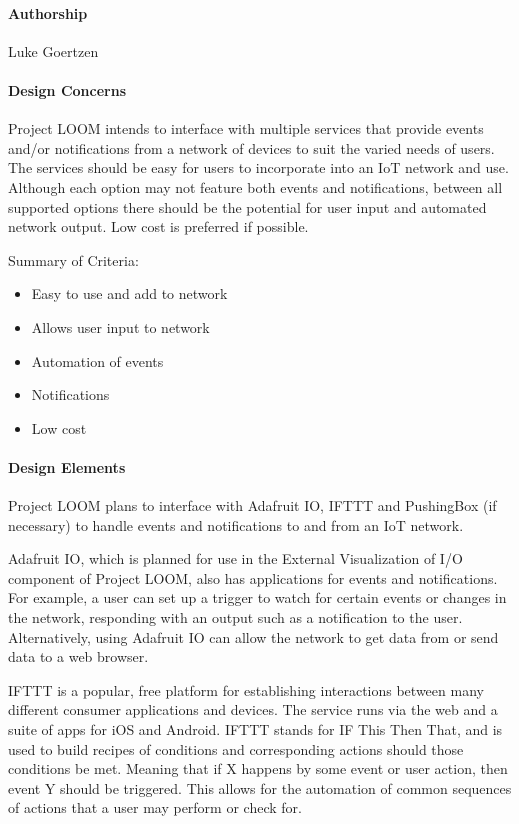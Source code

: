 \documentclass[onecolumn, draftclsnofoot,10pt, compsoc]{IEEEtran}
\begin{document}
\paragraph{Authorship}
    Luke Goertzen

\paragraph{Design Concerns}
    Project LOOM intends to interface with multiple services that provide events and/or notifications from a network of devices to suit the varied needs of users. The services should be easy for users to incorporate into an IoT network and use. Although each option may not feature both events and notifications, between all supported options there should be the potential for user input and automated network output. Low cost is preferred if possible.

    Summary of Criteria:
    \begin{itemize}[noitemsep,topsep=-10pt]
        \item Easy to use and add to network
        \item Allows user input to network
        \item Automation of events
        \item Notifications
        \item Low cost
    \end{itemize}

\paragraph{Design Elements}
    Project LOOM plans to interface with Adafruit IO, IFTTT and PushingBox (if necessary) to handle events and notifications to and from an IoT network.

    Adafruit IO, which is planned for use in the External Visualization of I/O component of Project LOOM, also has applications for events and notifications. For example, a user can set up a trigger to watch for certain events or changes in the network, responding with an output such as a notification to the user. Alternatively, using Adafruit IO can allow the network to get data from or send data to a web browser. \cite{adafruitio}

    IFTTT is a popular, free platform for establishing interactions between many different consumer applications and devices. The service runs via the web and a suite of apps for iOS and Android. IFTTT stands for IF This Then That, and is used to build recipes of conditions and corresponding actions should those conditions be met. Meaning that if X happens by some event or user action, then event Y should be triggered. This allows for the automation of common sequences of actions that a user may perform or check for. \cite{ifttt}
\end{document}
